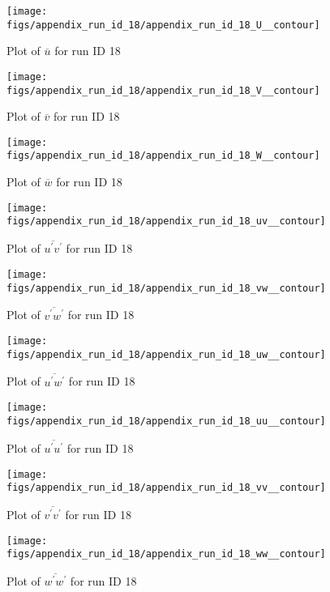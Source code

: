 \begin{figure}[H]
\centering
\texttt{[image: figs/appendix\_run\_id\_18/appendix\_run\_id\_18\_U\_\_contour]}
\caption{Plot of $\overline{u}$ for run ID 18}
\label{fig:appendix_run_id_18_U__contour}
\end{figure}


\begin{figure}[H]
\centering
\texttt{[image: figs/appendix\_run\_id\_18/appendix\_run\_id\_18\_V\_\_contour]}
\caption{Plot of $\overline{v}$ for run ID 18}
\label{fig:appendix_run_id_18_V__contour}
\end{figure}


\begin{figure}[H]
\centering
\texttt{[image: figs/appendix\_run\_id\_18/appendix\_run\_id\_18\_W\_\_contour]}
\caption{Plot of $\overline{w}$ for run ID 18}
\label{fig:appendix_run_id_18_W__contour}
\end{figure}


\begin{figure}[H]
\centering
\texttt{[image: figs/appendix\_run\_id\_18/appendix\_run\_id\_18\_uv\_\_contour]}
\caption{Plot of $\overline{u^\prime v^\prime}$ for run ID 18}
\label{fig:appendix_run_id_18_uv__contour}
\end{figure}


\begin{figure}[H]
\centering
\texttt{[image: figs/appendix\_run\_id\_18/appendix\_run\_id\_18\_vw\_\_contour]}
\caption{Plot of $\overline{v^\prime w^\prime}$ for run ID 18}
\label{fig:appendix_run_id_18_vw__contour}
\end{figure}


\begin{figure}[H]
\centering
\texttt{[image: figs/appendix\_run\_id\_18/appendix\_run\_id\_18\_uw\_\_contour]}
\caption{Plot of $\overline{u^\prime w^\prime}$ for run ID 18}
\label{fig:appendix_run_id_18_uw__contour}
\end{figure}


\begin{figure}[H]
\centering
\texttt{[image: figs/appendix\_run\_id\_18/appendix\_run\_id\_18\_uu\_\_contour]}
\caption{Plot of $\overline{u^\prime u^\prime}$ for run ID 18}
\label{fig:appendix_run_id_18_uu__contour}
\end{figure}


\begin{figure}[H]
\centering
\texttt{[image: figs/appendix\_run\_id\_18/appendix\_run\_id\_18\_vv\_\_contour]}
\caption{Plot of $\overline{v^\prime v^\prime}$ for run ID 18}
\label{fig:appendix_run_id_18_vv__contour}
\end{figure}


\begin{figure}[H]
\centering
\texttt{[image: figs/appendix\_run\_id\_18/appendix\_run\_id\_18\_ww\_\_contour]}
\caption{Plot of $\overline{w^\prime w^\prime}$ for run ID 18}
\label{fig:appendix_run_id_18_ww__contour}
\end{figure}


